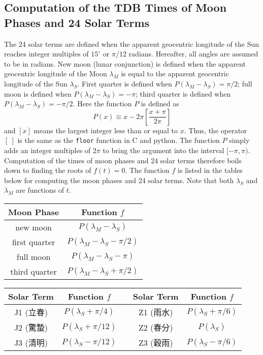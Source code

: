 \documentclass[12pt]{article}
\newcommand \beq {\begin{equation}}
\newcommand \eeq {\end{equation}}
\begin{document}
\begin{CJK}{UTF8}{bkai}
\section{Computation of the TDB Times of Moon Phases and 24 Solar Terms} 
\label{sec:TDBtimes}

The 24 solar terms are defined when the apparent geocentric longitude of the 
Sun reaches integer multiples of $15^\circ$ or $\pi/12$ radians. Hereafter, 
all angles are assumed to be in radians. New moon (lunar conjunction) 
is defined when the apparent geocentric longitude of the Moon $\lambda_M$ is 
equal to the apparent geocentric longitude of the Sun $\lambda_S$. First 
quarter is defined when $P(\lambda_M-\lambda_S) = \pi/2$; 
full moon is defined when $P(\lambda_M-\lambda_S) = -\pi$; 
third quarter is defined when $P(\lambda_M-\lambda_S) = -\pi/2$. 
Here the function $P$ is defined as 
\beq
  P(x) \equiv x - 2\pi \left[ \frac{x+\pi}{2\pi}\right] 
\eeq
and $[x]$ means the largest integer less than or equal to $x$. Thus, the 
operator $[\ ]$ is the same as the {\tt floor} function in C and python. 
The function $P$ simply adds an integer multiples of $2\pi$ to bring the 
argument into the interval $[-\pi,\pi)$.
Computation of the times of moon phases and 24 solar terms therefore boils 
down to finding the roots of $f(t)=0$. The function $f$ is listed in the tables 
below for computing the moon phases and 24 solar terms. Note that both $\lambda_S$ 
and $\lambda_M$ are functions of $t$.
\vskip 5mm
\begin{tabular}{cc}
\hline
 Moon Phase & Function $f$ \\
\hline 
 new moon & $P(\lambda_M - \lambda_S)$ \\ 
 first quarter & $P(\lambda_M - \lambda_S - \pi/2)$ \\ 
 full moon & $P(\lambda_M - \lambda_S - \pi)$ \\
 third quarter & $P(\lambda_M - \lambda_S + \pi/2)$ \\
\hline
\end{tabular}
\vskip 5mm
\begin{tabular}{cc|c|cc}
\hline
 Solar Term & Function $f$ & & Solar Term & Function $f$ \\
\hline
  J1 (立春) & $P(\lambda_S + \pi/4)$ & & Z1 (雨水) & $P(\lambda_S + \pi/6)$  \\ 
  J2 (驚蟄) & $P(\lambda_S + \pi/12)$ & & Z2 (春分) & $P(\lambda_S)$ \\
  J3 (清明) & $P(\lambda_S - \pi/12)$ & & Z3 (穀雨) & $P(\lambda_S - \pi/6)$ \\

\end{tabular}
\end{CJK}
\end{document}
